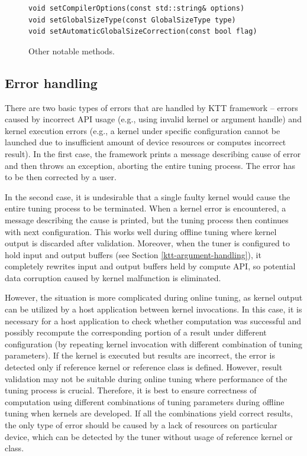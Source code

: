\documentclass
[
    digital, %
    oneside, %
    table, %
    nolof, %
    nolot, %
    nocover %
]{fithesis3}
\begin{document}
\begin{figure}
\begin{adjustwidth}{-1cm}{-1cm}
\begin{lstlisting}
void setCompilerOptions(const std::string& options)
void setGlobalSizeType(const GlobalSizeType type)
void setAutomaticGlobalSizeCorrection(const bool flag)
\end{lstlisting}
\caption{Other notable methods.}
\label{ktt-utility-methods}
\end{adjustwidth}
\end{figure}

\subsection{Error handling}
There are two basic types of errors that are handled by KTT framework -- errors caused by incorrect API usage (e.g., using invalid kernel or argument
handle) and kernel execution errors (e.g., a kernel under specific configuration cannot be launched due to insufficient amount of device resources or
computes incorrect result). In the first case, the framework prints a message describing cause of error and then throws an exception, aborting the entire
tuning process. The error has to be then corrected by a user.

In the second case, it is undesirable that a single faulty kernel would cause the entire tuning process to be terminated. When a kernel error is
encountered, a message describing the cause is printed, but the tuning process then continues with next configuration. This works well during offline
tuning where kernel output is discarded after validation. Moreover, when the tuner is configured to hold input and output buffers (see Section \ref{ktt-argument-handling}),
it completely rewrites input and output buffers held by compute API, so potential data corruption caused by kernel malfunction is eliminated. 

However, the situation is more complicated during online tuning, as kernel output can be utilized by a host application between kernel invocations. In
this case, it is necessary for a host application to check whether computation was successful and possibly recompute the corresponding portion of a result
under different configuration (by repeating kernel invocation with different combination of tuning parameters). If the kernel is executed but results are
incorrect, the error is detected only if reference kernel or reference class is defined. However, result validation may not be suitable during online tuning
where performance of the tuning process is crucial. Therefore, it is best to ensure correctness of computation using different combinations of tuning parameters
during offline tuning when kernels are developed. If all the combinations yield correct results, the only type of error should be caused by a lack of
resources on particular device, which can be detected by the tuner without usage of reference kernel or class.
\end{document}

